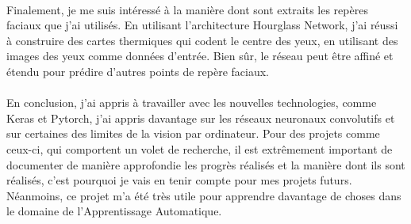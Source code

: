 \paragraph{}
Finalement, je me suis intéressé à la manière dont sont extraits les repères faciaux que j'ai utilisés.
En utilisant l'architecture Hourglass Network, j'ai réussi à construire des cartes thermiques qui codent le centre des yeux, en utilisant des images des yeux comme données d'entrée.
Bien sûr, le réseau peut être affiné et étendu pour prédire d'autres points de repère faciaux.

\paragraph{}
En conclusion, j'ai appris à travailler avec les nouvelles technologies, comme Keras et Pytorch, j'ai appris davantage sur les réseaux neuronaux convolutifs et sur certaines des limites de la vision par ordinateur.
Pour des projets comme ceux-ci, qui comportent un volet de recherche, il est extrêmement important de documenter de manière approfondie les progrès réalisés et la manière dont ils sont réalisés, c'est pourquoi je vais en tenir compte pour mes projets futurs.
Néanmoins, ce projet m'a été très utile pour apprendre davantage de choses dans le domaine de l'Apprentissage Automatique.






